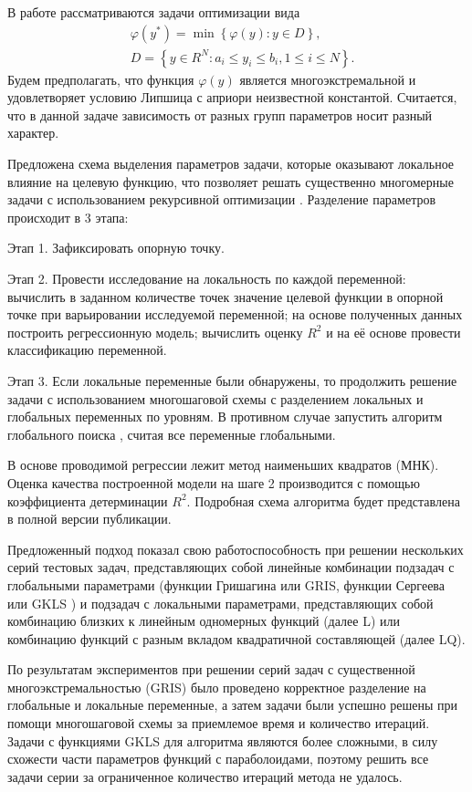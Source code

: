 \documentclass[11pt, oneside, a4paper]{article}
\begin{document}
В работе рассматриваются задачи оптимизации вида 
\begin{eqnarray}\label{main_problem}
& \varphi(y^\ast)=\min{\left\{\varphi(y): y\in D\right\}}, \nonumber \\
& D=\left\{y\in R^N: a_i\leq y_i \leq b_i, 1\leq i \leq N\right\}. \nonumber
\end{eqnarray}
Будем предполагать, что функция $\varphi(y)$ является многоэкстремальной и удовлетворяет условию Липшица с априори неизвестной константой. Считается, что в данной задаче зависимость от разных групп параметров носит разный характер.

Предложена схема выделения параметров задачи, которые оказывают локальное влияние на целевую функцию, что позволяет решать существенно многомерные задачи с использованием рекурсивной оптимизации \cite{Grishagin2007}. Разделение параметров происходит в 3 этапа:

Этап 1. Зафиксировать опорную точку. 

Этап 2. Провести исследование на локальность по каждой переменной: вычислить в заданном количестве точек значение целевой функции в опорной точке при варьировании исследуемой переменной; на основе полученных данных построить регрессионную модель; вычислить оценку $R^2$ и на её основе провести классификацию переменной.

Этап 3. Если локальные переменные были обнаружены, то продолжить решение задачи с использованием многошаговой схемы с разделением локальных и глобальных переменных по уровням. В противном случае запустить алгоритм глобального поиска \cite{Grishagin2007}, считая все переменные глобальными.

В основе проводимой регрессии лежит метод наименьших квадратов (МНК). Оценка качества построенной модели на шаге 2 производится с помощью коэффициента детерминации $R^2$. Подробная схема алгоритма будет представлена в полной версии публикации.

Предложенный подход показал свою работоспособность при решении нескольких серий тестовых задач, представляющих собой линейные комбинации подзадач с глобальными параметрами (функции Гришагина или GRIS, функции Сергеева или GKLS \cite{Grishagin2001}) и подзадач с локальными параметрами, представляющих собой комбинацию близких к линейным одномерных функций (далее L) или  комбинацию  функций с разным вкладом квадратичной составляющей (далее LQ).

По результатам экспериментов при решении серий задач с существенной многоэкстремальностью (GRIS) было проведено корректное разделение на глобальные и локальные переменные, а затем задачи были успешно решены при помощи многошаговой схемы за приемлемое время и количество итераций. Задачи с функциями  GKLS для алгоритма являются более сложными, в силу схожести части параметров функций с параболоидами, поэтому решить все задачи серии за ограниченное количество итераций метода не удалось.
\end{document}
